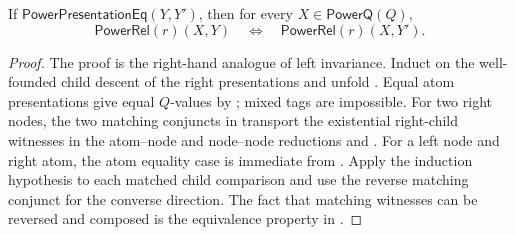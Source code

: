 \begin{lemma}
If $\mathsf{PowerPresentationEq}(Y,Y')$, then for every
$X\in\mathsf{PowerQ}(Q)$,
\[
\mathsf{PowerRel}(r)(X,Y)\quad\Longleftrightarrow\quad
\mathsf{PowerRel}(r)(X,Y').
\]
\end{lemma}
\begin{proof}
The proof is the right-hand analogue of left invariance.  Induct on the
well-founded child descent of the right presentations and unfold
.  Equal atom presentations give equal $Q$-values by
; mixed tags are impossible.  For two right
nodes, the two matching conjuncts in  transport
the existential right-child witnesses in the atom--node and node--node
reductions  and .  For a
left node and right atom, the atom equality case is immediate from
.  Apply the induction hypothesis to each matched
child comparison and use the reverse matching conjunct for the converse
direction.  The fact that matching witnesses can be reversed and composed
is the equivalence property in .
\end{proof}
